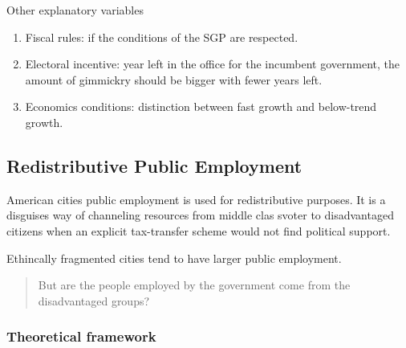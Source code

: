 Other explanatory variables

\begin{enumerate}
\def\labelenumi{\arabic{enumi}.}
\itemsep1pt\parskip0pt
\item
  Fiscal rules: if the conditions of the SGP are respected.
\item
  Electoral incentive: year left in the office for the incumbent
  government, the amount of gimmickry should be bigger with fewer years
  left.
\item
  Economics conditions: distinction between fast growth and below-trend
  growth.
\end{enumerate}

\subsection{Redistributive Public
Employment}\label{redistributive-public-employment}

American cities public employment is used for redistributive purposes.
It is a disguises way of channeling resources from middle clas svoter to
disadvantaged citizens when an explicit tax-transfer scheme would not
find political support.

Ethincally fragmented cities tend to have larger public employment.

\begin{quote}
But are the people employed by the government come from the
disadvantaged groups?
\end{quote}

\subsubsection{Theoretical framework}\label{theoretical-framework}


